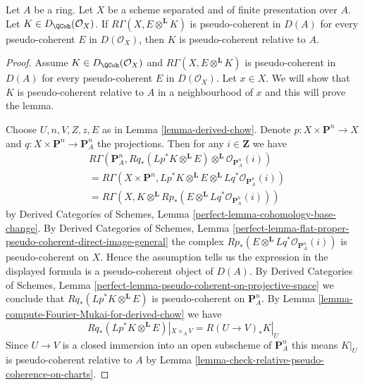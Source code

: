 \begin{lemma}
\label{lemma-characterize-pseudo-coherent}
Let $A$ be a ring. Let $X$ be a scheme separated and
of finite presentation over $A$. Let $K \in D_\QCoh(\mathcal{O}_X)$.
If $R\Gamma(X, E \otimes^\mathbf{L} K)$ is pseudo-coherent
in $D(A)$ for every pseudo-coherent $E$ in $D(\mathcal{O}_X)$,
then $K$ is pseudo-coherent relative to $A$.
\end{lemma}

\begin{proof}
Assume $K \in D_\QCoh(\mathcal{O}_X)$ and
$R\Gamma(X, E \otimes^\mathbf{L} K)$ is pseudo-coherent
in $D(A)$ for every pseudo-coherent $E$ in $D(\mathcal{O}_X)$.
Let $x \in X$. We will show that $K$ is pseudo-coherent relative to $A$
in a neighbourhood of $x$ and this will prove the lemma.

\medskip\noindent
Choose $U, n, V, Z, z, E$ as in Lemma \ref{lemma-derived-chow}.
Denote $p : X \times \mathbf{P}^n \to X$ and
$q : X \times \mathbf{P}^n \to \mathbf{P}^n_A$
the projections.
Then for any $i \in \mathbf{Z}$ we have
\begin{align*}
& R\Gamma(\mathbf{P}^n_A,
Rq_*(Lp^*K \otimes^\mathbf{L} E)
\otimes^\mathbf{L}
\mathcal{O}_{\mathbf{P}^n_A}(i)) \\
& =
R\Gamma(X \times \mathbf{P}^n,
Lp^*K \otimes^\mathbf{L} E \otimes^\mathbf{L}
Lq^*\mathcal{O}_{\mathbf{P}^n_A}(i)) \\
& =
R\Gamma(X,
K \otimes^\mathbf{L} Rp_*(E \otimes^\mathbf{L}
Lq^*\mathcal{O}_{\mathbf{P}^n_A}(i)))
\end{align*}
by 
Derived Categories of Schemes,
Lemma \ref{perfect-lemma-cohomology-base-change}.
By
Derived Categories of Schemes,
Lemma \ref{perfect-lemma-flat-proper-pseudo-coherent-direct-image-general}
the complex $Rp_*(E \otimes^\mathbf{L} Lq^*\mathcal{O}_{\mathbf{P}^n_A}(i))$
is pseudo-coherent on $X$. Hence the assumption tells us the expression
in the displayed formula is a pseudo-coherent object of $D(A)$.
By
Derived Categories of Schemes,
Lemma \ref{perfect-lemma-pseudo-coherent-on-projective-space}
we conclude that $Rq_*(Lp^*K \otimes^\mathbf{L} E)$ is
pseudo-coherent on $\mathbf{P}^n_A$.
By Lemma \ref{lemma-compute-Fourier-Mukai-for-derived-chow}
we have
$$
Rq_*(Lp^*K \otimes^\mathbf{L} E)|_{X \times_A V} =
R(U \to V)_*K|_U
$$
Since $U \to V$ is a closed immersion into an open subscheme of
$\mathbf{P}^n_A$ this means $K|_U$ is pseudo-coherent relative to $A$
by Lemma \ref{lemma-check-relative-pseudo-coherence-on-charts}.
\end{proof}

